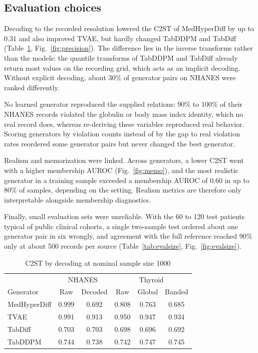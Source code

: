 \documentclass[pdflatex,referee]{sn-jnl}%
\begin{document}
\subsection*{Evaluation choices}

Decoding to the recorded resolution lowered the C2ST of MedHyperDiff by up to 0.31 and also improved TVAE, but hardly changed TabDDPM and TabDiff (Table~\ref{tab:precision}, Fig.~\ref{fig:precision}). The difference lies in the inverse transforms rather than the models: the quantile transforms of TabDDPM and TabDiff already return most values on the recording grid, which acts as an implicit decoding. Without explicit decoding, about 30\% of generator pairs on NHANES were ranked differently.

No learned generator reproduced the supplied relations: 90\% to 100\% of their NHANES records violated the globulin or body mass index identity, which no real record does, whereas re-deriving these variables reproduced real behavior. Scoring generators by violation counts instead of by the gap to real violation rates reordered some generator pairs but never changed the best generator.

Realism and memorization were linked. Across generators, a lower C2ST went with a higher membership AUROC (Fig.~\ref{fig:memo}), and the most realistic generator in a training sample exceeded a membership AUROC of 0.60 in up to 80\% of samples, depending on the setting. Realism metrics are therefore only interpretable alongside membership diagnostics.

Finally, small evaluation sets were unreliable. With the 60 to 120 test patients typical of public clinical cohorts, a single two-sample test ordered about one generator pair in six wrongly, and agreement with the full reference reached 90\% only at about 500 records per source (Table~\ref{tab:evalsize}, Fig.~\ref{fig:evalsize}).

\begin{table}[htbp]
\caption{C2ST by decoding at nominal sample size 1000}
\label{tab:precision}
\centering
\footnotesize
\setlength{\tabcolsep}{3pt}
\begin{tabular}{lccccc}
\toprule
& \multicolumn{2}{c}{NHANES} & \multicolumn{3}{c}{Thyroid} \\
Generator & Raw & Decoded & Raw & Global & Banded \\
\midrule
MedHyperDiff & 0.999 & 0.692 & 0.808 & 0.763 & 0.685 \\
TVAE & 0.991 & 0.913 & 0.950 & 0.947 & 0.934 \\
TabDiff & 0.703 & 0.703 & 0.698 & 0.696 & 0.692 \\
TabDDPM & 0.744 & 0.738 & 0.742 & 0.747 & 0.745 \\
\bottomrule
\end{tabular}
\end{table}
\end{document}
